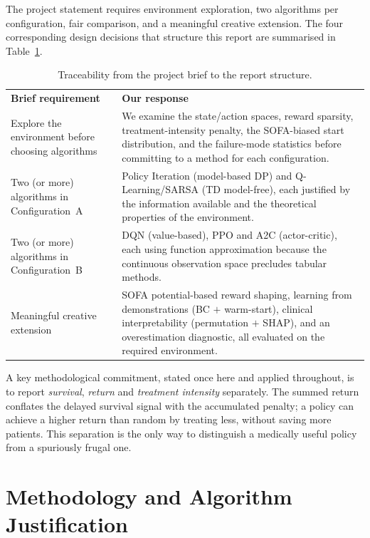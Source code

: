 \documentclass[11pt,a4paper]{article}
\newcommand{\tH}[1]{\textcolor{novagreen}{\textbf{#1}}}
\newcommand{\gmid}{\arrayrulecolor{novagreen}\midrule\arrayrulecolor{black}}
\begin{document}
The project statement requires environment exploration, two algorithms per
configuration, fair comparison, and a meaningful creative extension. The four
corresponding design decisions that structure this report are summarised in
Table~\ref{tab:brief_trace}.

\begin{table}[H]
\centering
\begin{tabularx}{\textwidth}{>{\raggedright\arraybackslash}p{}X}
\toprule
\tH{Brief requirement} & \tH{Our response} \\
\gmid
Explore the environment before choosing algorithms &
  We examine the state/action spaces, reward sparsity, treatment-intensity penalty,
  the SOFA-biased start distribution, and the failure-mode statistics before
  committing to a method for each configuration. \\
Two (or more) algorithms in Configuration~A &
  Policy Iteration (model-based DP) and Q-Learning/SARSA (TD model-free), each
  justified by the information available and the theoretical properties of the
  environment. \\
Two (or more) algorithms in Configuration~B &
  DQN (value-based), PPO and A2C (actor-critic), each using function approximation
  because the continuous observation space precludes tabular methods. \\
Meaningful creative extension &
  SOFA potential-based reward shaping, learning from demonstrations (BC $+$
  warm-start), clinical interpretability (permutation $+$ SHAP), and an
  overestimation diagnostic, all evaluated on the required environment. \\
\bottomrule
\end{tabularx}
\caption{Traceability from the project brief to the report structure.}
\label{tab:brief_trace}
\end{table}

A key methodological commitment, stated once here and applied throughout, is to
report \emph{survival}, \emph{return} and \emph{treatment intensity} separately.
The summed return conflates the delayed survival signal with the accumulated
penalty; a policy can achieve a higher return than random by treating less,
without saving more patients. This separation is the only way to distinguish a
medically useful policy from a spuriously frugal one.


\section{Methodology and Algorithm Justification}
\label{sec:methods}
\end{document}
